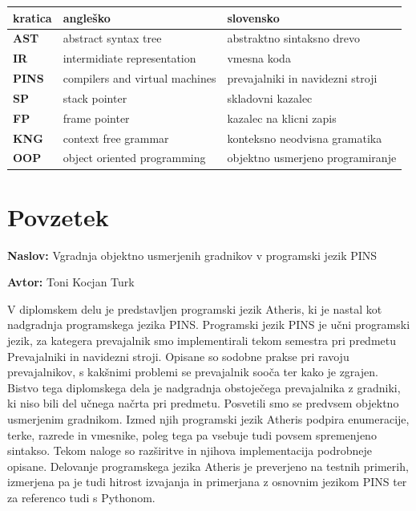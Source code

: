 \documentclass[a4paper, 12p]{book}
\newcommand{\ttitle}{Vgradnja objektno usmerjenih gradnikov v programski jezik PINS}
\newcommand{\tauthor}{Toni Kocjan Turk}
\newcommand{\clearemptydoublepage}{\newpage{\pagestyle{empty}\cleardoublepage}}
\begin{document}
\noindent\begin{tabular}{l|l|l}
	{\bf kratica} & {\bf angleško} & {\bf slovensko} \\ \hline
	{\bf AST} & abstract syntax tree & abstraktno sintaksno drevo \\
	{\bf IR} & intermidiate representation & vmesna koda \\
	{\bf PINS} & compilers and virtual machines & prevajalniki in navidezni stroji \\
	{\bf SP} & stack pointer & skladovni kazalec \\
	{\bf FP} & frame pointer & kazalec na klicni zapis \\
	{\bf KNG} & context free grammar & konteksno neodvisna gramatika \\
	{\bf OOP} & object oriented programming & objektno usmerjeno programiranje \\
\end{tabular}


\clearemptydoublepage

\chapter*{Povzetek}

\noindent\textbf{Naslov:} \ttitle
\bigskip

\noindent\textbf{Avtor:} \tauthor
\bigskip

\noindent V diplomskem delu je predstavljen programski jezik Atheris, ki je nastal kot nadgradnja programskega jezika PINS. Programski jezik PINS je učni programski jezik, za kategera prevajalnik smo implementirali tekom semestra pri predmetu Prevajalniki in navidezni stroji. Opisane so sodobne prakse pri ravoju prevajalnikov, s kakšnimi problemi se prevajalnik sooča ter kako je zgrajen. Bistvo tega diplomskega dela je nadgradnja obstoječega prevajalnika z gradniki, ki niso bili del učnega načrta pri predmetu. Posvetili smo se predvsem objektno usmerjenim gradnikom. Izmed njih programski jezik Atheris podpira enumeracije, terke, razrede in vmesnike, poleg tega pa vsebuje tudi povsem spremenjeno sintakso. Tekom naloge so razširitve in njihova implementacija podrobneje opisane. Delovanje programskega jezika Atheris je preverjeno na testnih primerih, izmerjena pa je tudi hitrost izvajanja in primerjana z osnovnim jezikom PINS ter za referenco tudi s Pythonom.
\end{document}
